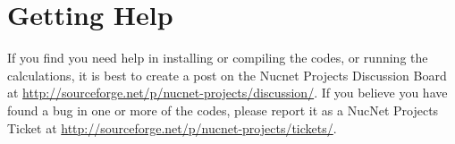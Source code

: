 \section*{Getting Help}

\hspace{12ex}If you find you need help in installing or compiling the codes, or running the 
calculations, it is best to create a post on the Nucnet Projects Discussion 
Board at \url{http://sourceforge.net/p/nucnet-projects/discussion/}.  If you 
believe you have found a bug in one or more of the codes, please report it as a 
NucNet Projects Ticket at 
\url{http://sourceforge.net/p/nucnet-projects/tickets/}.

